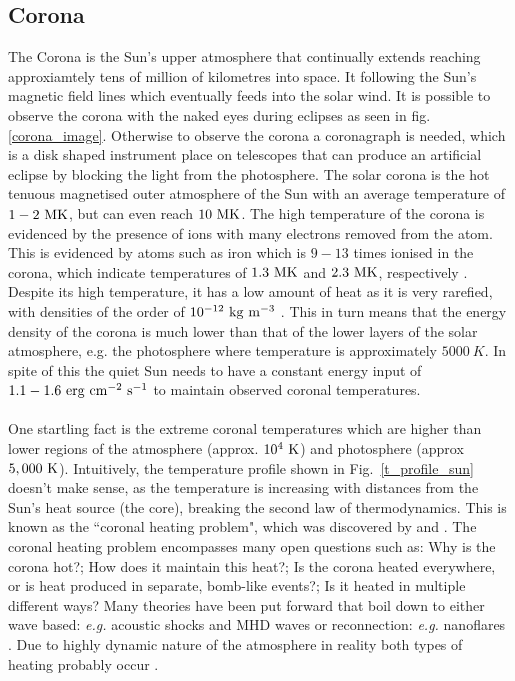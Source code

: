 \documentclass[12pt]{ociamthesis}
\newcommand{\np}{\\ \\}
\begin{document}
\subsection{Corona}
\label{ssec:corona}
The Corona is the Sun's upper atmosphere that continually extends reaching approxiamtely tens of million of kilometres into space. It following the Sun's magnetic field lines which eventually feeds into the solar wind. It is possible to observe the corona with the naked eyes during eclipses as seen in fig. \ref{corona_image}. Otherwise to observe the corona a coronagraph is needed, which is a disk shaped instrument place on telescopes that can produce an artificial eclipse by blocking the light from the photosphere. The solar corona is the hot tenuous magnetised outer atmosphere of the Sun with an average temperature of $1-2~\rm{MK}$, but can even reach $10~\rm{MK}$. The high temperature of the corona is evidenced by the presence of ions with many electrons removed from the atom. This is evidenced by atoms such as iron which is $9-13$ times ionised in the corona, which indicate temperatures of $1.3~\rm{MK}$ and $2.3~\rm{MK}$, respectively \citep{narayanan2014introduction}. Despite its high temperature, it has a low amount of heat as it is very rarefied, with densities of the order of $10^{-12}~\rm{kg~m^{-3}}$ \citep{priest2014magnetohydrodynamics}. This in turn means that the energy density of the corona is much lower than that of the lower layers of the solar atmosphere, e.g. the photosphere where temperature is approximately $5000~{K}$. In spite of this the quiet Sun needs to have a constant energy input of $1.1-1.6~\rm{erg~cm^{-2}~s^{-1}}$ \citep{Sakurai2017PJAB9387S} to maintain observed coronal temperatures. \np
%
One startling fact is the extreme coronal temperatures which are higher than lower regions of the atmosphere (approx. $10^4~\rm{K}$) and photosphere (approx $5,000~\rm{K}$). Intuitively, the temperature profile shown in Fig.~\ref{t_profile_sun} doesn't make sense, as the temperature is increasing with distances from the Sun's heat source (the core), breaking the second law of thermodynamics. This is known as the ``coronal heating problem", which was discovered by \cite{Grotrian1939} and \cite{Edl1943}. The coronal heating problem encompasses many open questions such as: Why is the corona hot?; How does it maintain this heat?; Is the corona heated everywhere, or is heat produced in separate, bomb-like events?; Is it heated in multiple different ways? Many theories have been put forward that boil down to either wave based: \textit{e.g.} acoustic shocks and MHD waves \citep{Alfv1947MNRAS107211A, Uchida1974SoPh35451U, Wentzel1974SoPh39129W, Priest1998Natur393545P, Antolin2008IAUS247279A, Escande2019NatSR914274E} or reconnection: \textit{e.g.} nanoflares \citep{Parker1988ApJ330474P, Cargill1993SoPh147263C, Parnell2000ApJ529554P, Klimchuk2001ApJ553440K,  Cargill2004ApJ605911C, Antolin2021NatAs554A}. Due to highly dynamic nature of the atmosphere in reality both types of heating probably occur \citep{Parnell2012RSPTA3703217P}. \np
\end{document}
